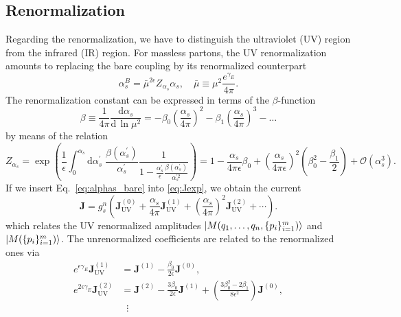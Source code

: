 \documentclass[a4paper,11pt]{article}
\begin{document}
\subsection{Renormalization}
Regarding the renormalization, we have to distinguish the ultraviolet (UV) region from the infrared (IR) region. For massless partons, the UV renormalization amounts to replacing the bare coupling by its renormalized counterpart
\begin{equation}
\alpha_s^B = \bar{\mu}^{2 \epsilon} Z_{\alpha_s} \alpha_s, \quad \bar{\mu} \equiv \mu^2 \frac{e^{\gamma_E}}{4 \pi}.
\label{eq:alphas_bare}
\end{equation}
The renormalization constant can be expressed in terms of the $\beta$-function
\begin{equation}
\beta \equiv \frac{1}{4 \pi} \frac{\mathrm{d} \alpha_s}{\mathrm{d}\, \ln \mu^2 } = - \beta_0 \left(\frac{\alpha_s}{4 \pi} \right)^2 - \beta_1 \left( \frac{\alpha_s}{4 \pi} \right)^3 - \ldots
\end{equation}
by means of the relation
\begin{equation}
Z_{\alpha_s} = \exp\!\left(\frac{1}{\epsilon} \int_0^{\alpha_s} \mathrm{d}\alpha_s^\prime\; \frac{\beta(\alpha_s^\prime)}{\alpha_s^\prime} \frac{1}{1 - \frac{\alpha_s^\prime}{\epsilon} \frac{\beta(\alpha_s^\prime)}{\alpha_s^{\prime 2}}} \right) = 1 - \frac{\alpha_s}{ 4 \pi \epsilon} \beta_0 + \left( \frac{\alpha_s}{4 \pi \epsilon} \right)^2 \left(\beta_0^2 - \frac{\beta_1}{2} \right) + \mathcal{O}(\alpha_s^3).
\end{equation}
If we insert Eq.~\eqref{eq:alphas_bare} into \eqref{eq:Jexp}, we obtain the current
\begin{equation}
\mathbf{J} = g_s^n \left(\mathbf{J}^{(0)}_{\text{UV}} + \frac{\alpha_s}{4 \pi}  \mathbf{J}^{(1)}_\text{UV} + \left(\frac{\alpha_s}{4 \pi}  \right)^2 \mathbf{J}^{(2)}_{\text{UV}} + \cdots \right).
\end{equation}
which relates the UV renormalized amplitudes $\ket{M(q_1, \ldots , q_n, \lbrace p_i \rbrace_{i = 1}^m)}$ and $\ket{M(\lbrace p_i \rbrace_{i = 1}^m)}$. The unrenormalized coefficients are related to the renormalized ones via
\begin{equation}
\begin{split}
e^{\epsilon \gamma_E} \mathbf{J}^{(1)}_{\text{UV}} &= \mathbf{J}^{(1)} - \frac{\beta_0}{2 \epsilon} \mathbf{J}^{(0)}, \\
e^{2 \epsilon \gamma_E} \mathbf{J}^{(2)}_{\text{UV}} &= \mathbf{J}^{(2)} - \frac{3 \beta_0}{2 \epsilon} \mathbf{J}^{(1)} + \left(\frac{3 \beta_0^2 - 2 \beta_1}{8 \epsilon^2} \right) \mathbf{J}^{(0)}, \\
&\; \; \vdots
\label{eq:UV}
\end{split}
\end{equation}
\end{document}
